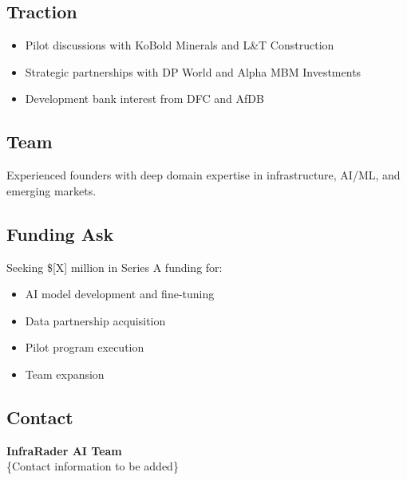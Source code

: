 \documentclass[executive]{../templates/infraradar-main}
\begin{document}
\subsection*{Traction}
\begin{itemize}
    \item Pilot discussions with KoBold Minerals and L\&T Construction
    \item Strategic partnerships with DP World and Alpha MBM Investments
    \item Development bank interest from DFC and AfDB
\end{itemize}

\subsection*{Team}
Experienced founders with deep domain expertise in infrastructure, AI/ML, and emerging markets.

\subsection*{Funding Ask}
Seeking \$[X] million in Series A funding for:
\begin{itemize}
    \item AI model development and fine-tuning
    \item Data partnership acquisition
    \item Pilot program execution
    \item Team expansion
\end{itemize}

\subsection*{Contact}
\textbf{InfraRader AI Team}\\
\{Contact information to be added\}
\end{document}
